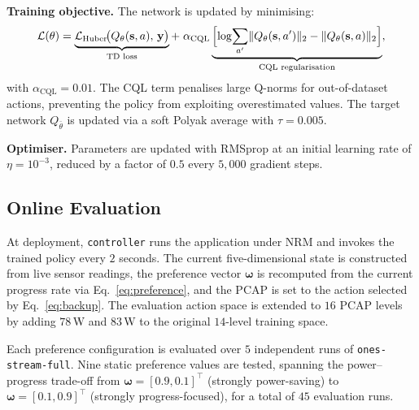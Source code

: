   \noindent\textbf{Training objective.}
  The network is updated by minimising:
  \begin{equation}
      \mathcal{L}(\theta) = \underbrace{%
          \mathcal{L}_{\text{Huber}}\!\bigl(Q_\theta(\mathbf{s},a),\,\mathbf{y}\bigr)%
      }_{\text{TD loss}}
      +\;
      \alpha_{\text{CQL}}\underbrace{%
          \Bigl[
              \log\!\sum_{a'} \lVert Q_\theta(\mathbf{s},a')\rVert_2
              - \lVert Q_\theta(\mathbf{s},a)\rVert_2
          \Bigr]%
      }_{\text{CQL regularisation}},
      \label{eq:loss}
  \end{equation}
  with $\alpha_{\text{CQL}} = 0.01$. The CQL term penalises large Q-norms for
  out-of-dataset actions, preventing the policy from exploiting overestimated
  values. The target network $Q_{\bar\theta}$ is updated via a soft Polyak
  average with $\tau = 0.005$.

  \noindent\textbf{Optimiser.}
  Parameters are updated with RMSprop at an initial learning rate of
  $\eta = 10^{-3}$, reduced by a factor of $0.5$ every $5{,}000$ gradient steps.

  \subsection{Online Evaluation}
  \label{sec:evaluation}

  At deployment, \texttt{controller} runs the application under NRM
  and invokes the trained policy every $2$ seconds. The current five-dimensional
  state is constructed from live sensor readings, the preference vector
  $\boldsymbol{\omega}$ is recomputed from the current progress rate via
  Eq.~\eqref{eq:preference}, and the PCAP is set to the action selected by
  Eq.~\eqref{eq:backup}. The evaluation action space is extended to $16$ PCAP
  levels by adding $78$\,W and $83$\,W to the original $14$-level training space.

  Each preference configuration is evaluated over $5$ independent runs of
  \texttt{ones-stream-full}. Nine static preference values are tested, spanning
  the power--progress trade-off from $\boldsymbol{\omega} = [0.9, 0.1]^{\top}$
  (strongly power-saving) to $\boldsymbol{\omega} = [0.1, 0.9]^{\top}$ (strongly
  progress-focused), for a total of $45$ evaluation runs.